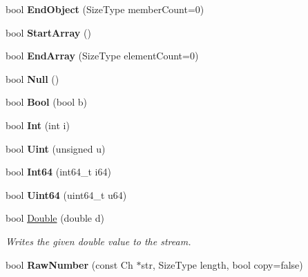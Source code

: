 \begin{Indent}
\begin{DoxyCompactItemize}
\item 
\mbox{\label{classWriter_a3705f6d3f9a820f0a6652089222ed3ac}} 
bool {\bfseries End\+Object} (Size\+Type member\+Count=0)
\item 
\mbox{\label{classWriter_a8a981ed4f5618a545724789ee4c8dedb}} 
bool {\bfseries Start\+Array} ()
\item 
\mbox{\label{classWriter_ad8680f9f8d3289dad72f1f18a8763aa1}} 
bool {\bfseries End\+Array} (Size\+Type element\+Count=0)
\item 
\mbox{\label{classWriter_a7d80ac367783ac4eb8b0118924b377bd}} 
bool {\bfseries Null} ()
\item 
\mbox{\label{classWriter_adf126d95f0aec7c2f7667df048227929}} 
bool {\bfseries Bool} (bool b)
\item 
\mbox{\label{classWriter_ae006cfa073c369c57797bc842b817ba4}} 
bool {\bfseries Int} (int i)
\item 
\mbox{\label{classWriter_a20c4edc79c0d5a9402e1deb8f09feadf}} 
bool {\bfseries Uint} (unsigned u)
\item 
\mbox{\label{classWriter_aa63032bf3dce66f817267cc451922a6e}} 
bool {\bfseries Int64} (int64\+\_\+t i64)
\item 
\mbox{\label{classWriter_a71b2ee12ae85d181eb9abdb686565615}} 
bool {\bfseries Uint64} (uint64\+\_\+t u64)
\item 
bool \hyperlink{classWriter_ae80dc830a4f1d84e6eaf6b182c0ceccb}{Double} (double d)
\begin{DoxyCompactList}\small\item\em Writes the given {\ttfamily double} value to the stream. \end{DoxyCompactList}\item 
\mbox{\label{classWriter_a3ce05da0fe6288502d6165da55c86d69}} 
bool {\bfseries Raw\+Number} (const Ch $\ast$str, Size\+Type length, bool copy=false)
\item 
\mbox{\label{classWriter_ac317eb622ea116293d99e3edffe6f1c3}} 

\end{DoxyCompactItemize}
\end{Indent}
